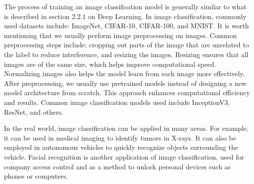 \begin{ZhChapter}
    The process of training an image classification model is generally similar to what is described in section 2.2.1 on Deep Learning. In image classification, commonly used datasets include: ImageNet, CIFAR-10, CIFAR-100, and MNIST. It is worth mentioning that we usually perform image preprocessing on images. Common preprocessing steps include: cropping out parts of the image that are unrelated to the label to reduce interference, and resizing the images. Resizing ensures that all images are of the same size, which helps improve computational speed. Normalizing images also helps the model learn from each image more effectively. After preprocessing, we usually use pretrained models instead of designing a new model architecture from scratch. This approach enhances computational efficiency and results. Common image classification models used include InceptionV3, ResNet, and others.

    In the real world, image classification can be applied in many areas. For example, it can be used in medical imaging to identify tumors in X-rays. It can also be employed in autonomous vehicles to quickly recognize objects surrounding the vehicle. Facial recognition is another application of image classification, used for company access control and as a method to unlock personal devices such as phones or computers.



\end{ZhChapter}
